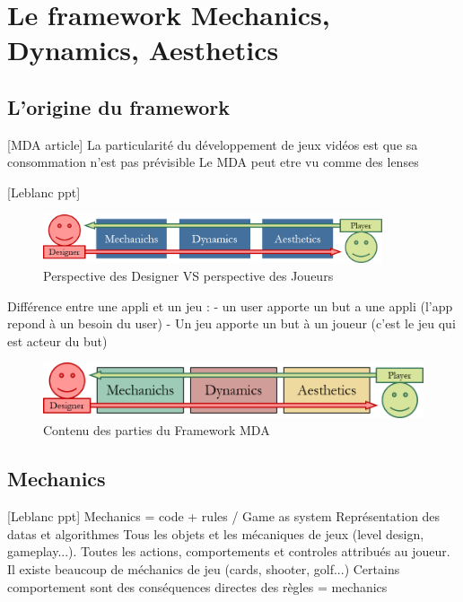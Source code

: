 \chapter{Le framework Mechanics, Dynamics, Aesthetics}



\section{L'origine du framework}
[MDA article]
La particularité du développement de jeux vidéos est que sa consommation n'est pas prévisible
Le MDA peut etre vu comme des lenses

[Leblanc ppt]
\begin{figure}[H]
    \centering
    \includegraphics[width=10cm]{10_img/chap3/desvspla.png} 
    \caption{Perspective des Designer VS perspective des Joueurs \cite{MDA_formal}}
\end{figure}
Différence entre une appli et un jeu : 
- un user apporte un but a une appli (l'app repond à un besoin du user)
- Un jeu apporte un but à un joueur (c'est le jeu qui est acteur du but)

\begin{figure}[H]
    \centering
    \includegraphics[width=14cm]{10_img/chap3/mda.png} 
    \caption{Contenu des parties du Framework MDA \cite{MDA_formal}}
\end{figure}


\section{Mechanics}
[Leblanc ppt] Mechanics = code + rules / Game as system
Représentation des datas et algorithmes
Tous les objets et les mécaniques de jeux (level design, gameplay...).
Toutes les actions, comportements et controles attribués au joueur.
Il existe beaucoup de méchanics de jeu (cards, shooter, golf...)
Certains comportement sont des conséquences directes des règles = mechanics



